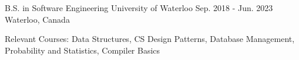 

\begin{cventries}

  \cventry
    {B.S. in Software Engineering} %
    {University of Waterloo} %
    {Sep. 2018 - Jun. 2023} %
    {Waterloo, Canada} %
    {
      \begin{cvitems} %
        \item {Relevant Courses: Data Structures, CS Design Patterns, Database Management, Probability and Statistics, Compiler Basics}
      \end{cvitems}
    }

\end{cventries}
